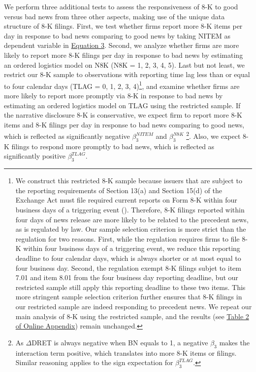 \documentclass[a4paper]{article}
\begin{document}
\begin{spacing}{2}
We perform three additional tests to assess the responsiveness of 8-K to good versus bad news from three other aspects, making use of the unique data structure of 8-K filings. First, we test whether firms report more 8-K items per day in response to bad news comparing to good news by taking NITEM as dependent variable in \hyperref[eq3]{Equation 3}. Second, we analyze whether firms are more likely to report more 8-K filings per day in response to bad news by estimating an ordered logistics model on N8K (N8K = 1, 2, 3, 4, 5). Last but not least, we restrict our 8-K sample to observations with reporting time lag less than or equal to four calendar days (TLAG = 0, 1, 2, 3, 4)\footnote{We construct this restricted 8-K sample because issuers that are subject to the reporting requirements of Section 13(a) and Section 15(d) of the Exchange Act must file required current reports on Form 8-K within four business days of a triggering event (\cite{secFinalRuleAdditional2004}). Therefore, 8-K filings reported within four days of news release are more likely to be related to the precedent news, as is regulated by law. Our sample selection criterion is more strict than the regulation for two reasons. First, while the regulation requires firms to file 8-K within four business days of a triggering event, we reduce this reporting deadline to four calendar days, which is always shorter or at most equal to four business day. Second, the regulation exempt 8-K filings subjet to item 7.01 and item 8.01 from the four business day reporting deadline, but our restricted sample still apply this reporting deadline to these two items. This more stringent sample selection criterion further ensures that 8-K filings in our restricted sample are indeed responding to precedent news. We repeat our main analysis of 8-K using the restricted sample, and the results (see \hyperref[oat2]{Table 2 of Online Appendix}) remain unchanged. }, and examine whether firms are more likely to report more promptly via 8-K in response to bad news by estimating an ordered logistics model on TLAG using the restricted sample. If the narrative disclosure 8-K is conservative, we expect firm to report more 8-K items and 8-K filings per day in response to bad news comparing to good news, which is reflected as significantly negative $\beta_3^{NITEM}$ and $\beta_3^{N8K}$ \footnote{As $\Delta$DRET is always negative when BN equals to 1, a negative $\beta_3$ makes the interaction term positive, which translates into more 8-K items or filings. Similar reasoning applies to the sign expectation for $\beta_3^{TLAG}$.}. Also, we expect 8-K filings to respond more promptly to bad news, which is reflected as significantly positive $\beta_3^{TLAG}$.


\end{spacing}
\end{document}
